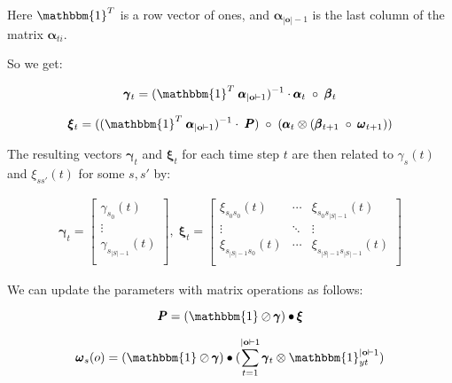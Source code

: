 Here $\mathbbm{1}^T$ is a row vector of ones, and $\pmb{\alpha}_{|\mathbf{o}|-1}$ is the last column of the matrix $\pmb{\alpha}_{ti}$.

So we get:

\begin{equation}
\pmb{\gamma}
    _t = (\mathbbm{1}^T \; \pmb{\alpha}_{|\mathbf{o}|-1})^{-1} \cdot \pmb{\alpha}_t \; \circ \; \pmb{\beta}_t
    \label{eq:gamma-matrix-ones}
\end{equation}

\begin{equation}
\pmb{\xi}
    _t = ((\mathbbm{1}^T \; \pmb{\alpha}_{|\mathbf{o}|-1})^{-1} \cdot \; \pmb{P}) \; \circ \;(\pmb{\alpha}_t \otimes (\pmb{\beta}_{t+1} \; \circ \; \pmb{\omega}_{t+1}))
    \label{eq:xi-matrix-ones}
\end{equation}

The resulting vectors $\pmb{\gamma}_t$ and $\pmb{\xi}_t$ for each time step $t$ are then related to $\gamma_s(t)$ and $\xi_{ss'}(t)$ for some $s, s'$ by:

\begin{align}
\pmb{\gamma}_t = 
    \begin{bmatrix}
        \gamma_{s_0}(t)       \\
        \vdots                \\
        \gamma_{s_{|S|-1}}(t) \\
    \end{bmatrix}, \;
\pmb{\xi}_t = 
    \begin{bmatrix}
        \xi_{s_0 s_0}(t)      & \cdots & \xi_{s_0 s_{|S|-1}}(t)      \\
        \vdots                & \ddots & \vdots                      \\
        \xi_{s_{|S|-1}s_0}(t) & \cdots & \xi_{s_{|S|-1}s_{|S|-1}}(t) \\
    \end{bmatrix}
\end{align}

We can update the parameters with matrix operations as follows:

\begin{equation}
\pmb{P}
    = (\mathbbm{1} \oslash \pmb{\gamma}) \bullet \pmb{\xi}
    \label{eq:transition-probabilities-update}
\end{equation}

\begin{equation}
\pmb{\omega}
    _s(o) = (\mathbbm{1} \oslash \pmb{\gamma}) \bullet (\sum_{t=1}^{|\mathbf{o}|-1} \pmb{\gamma}_t \otimes \mathbbm{1}_{yt}^{|\mathbf{o}|-1})
    \label{eq:omega-update}
\end{equation}

